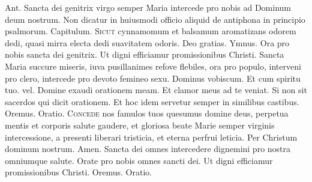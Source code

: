 \begin{multicols*}{2}
{\color{Red} Ant.} Sancta dei genitrix virgo semper Maria intercede pro nobis ad Dominum deum nostrum. {\color{Red} Non dicatur in huiusmodi officio aliquid de antiphona in principio psalmorum. Capitulum.}
\lettrine[lines=2]{\zallmancaps \color{Blue} S}{icut} cynnamomum et balsamum aromatizans odorem dedi, quasi mirra electa dedi suavitatem odoris. Deo gratias. {\color{Red} Ymnus.}
\newline \V Ora pro nobis sancta dei genitrix.
\newline \R Ut digni efficiamur promissionibus Christi.
 Sancta Maria succure miseris, iuva pusillanimes refove flebiles, ora pro populo, interveni pro clero, intercede pro devoto femineo sexu. Dominus vobiscum. Et cum spiritu tuo. {\color{Red} vel.} Domine exaudi orationem meam. Et clamor meus ad te veniat. {\color{Red} Si non sit sacerdos qui dicit orationem. Et hoc idem servetur semper in similibus castibus. Oremus. Oratio.}
\lettrine[lines=2]{\zallmancaps \color{Blue} C}{oncede} nos famulos tuos quesumus domine deus, perpetua mentis et corporis salute gaudere, et gloriosa beate Marie semper virginis intercessione, a presenti liberari tristicia, et eterna perfrui leticia. Per Christum dominum nostrum. Amen.
 Sancta dei omnes intercedere dignemini pro nostra omniumque salute. \V Orate pro nobis omnes sancti dei. \R Ut digni efficiamur promissionibus Christi. Oremus. {\color{Red} Oratio.}

\end{multicols*}
